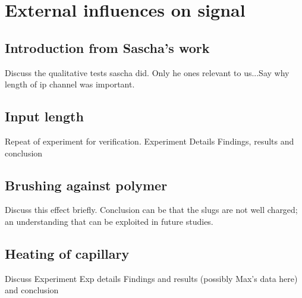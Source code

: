\documentclass[main.tex]{subfiles}
\begin{document}
%
\chapter[External influences on signal]{External influences on signal}
%
\section[Introduction from Sascha's Work]{Introduction from Sascha's work}
Discuss the qualitative tests sascha did. Only he ones relevant to us...Say why length of ip channel was important.
%
\section[Input length]{Input length}
Repeat of experiment for verification.
Experiment Details
Findings, results and conclusion
%
\section[Brushing against polymer]{Brushing against polymer}
Discuss this effect briefly. Conclusion can be that the slugs are not well charged; an understanding that can be exploited in future studies.
%
\section[Heating of capillary]{Heating of capillary}
Discuss Experiment
Exp details
Findings and results (possibly Max's data here) and conclusion
%
\end{document}
